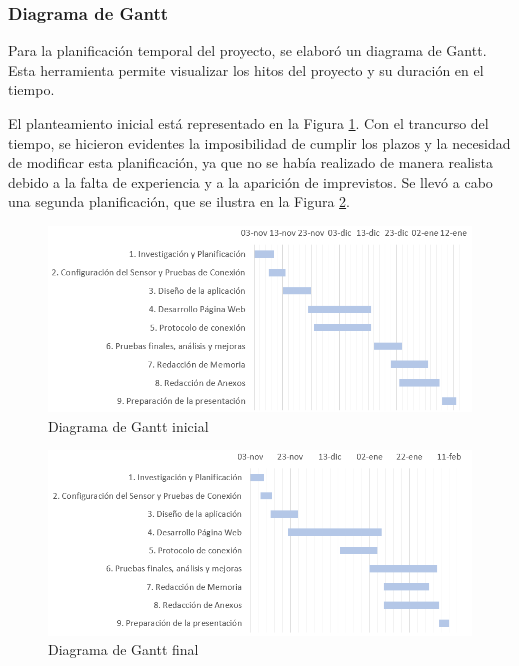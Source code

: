 \subsubsection{Diagrama de Gantt}
Para la planificación temporal del proyecto, se elaboró un diagrama de Gantt. Esta herramienta permite visualizar los hitos del proyecto y su duración en el tiempo.

El planteamiento inicial está representado en la Figura \ref{fig:gantt1}. Con el trancurso del tiempo, se hicieron evidentes la imposibilidad de cumplir los plazos y la necesidad de modificar esta planificación, ya que no se había realizado de manera realista debido a la falta de experiencia y a la aparición de imprevistos. Se llevó a cabo una segunda planificación, que se ilustra en la Figura \ref{fig:gantt2}.

\begin{figure}[h]
    \centering
    \includegraphics[width=1\textwidth]{img/A2_PlanTemporal/Gantt_Inicial.png}
    \caption{Diagrama de Gantt inicial}
    \label{fig:gantt1}
\end{figure}

\begin{figure}[h]
    \centering
    \includegraphics[width=1\textwidth]{img/A2_PlanTemporal/Gantt_Final.png}
    \caption{Diagrama de Gantt final}
    \label{fig:gantt2}
\end{figure}


